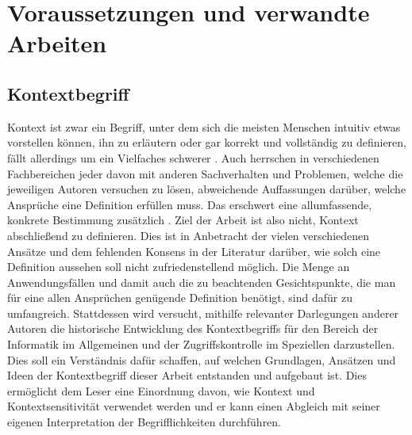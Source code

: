 \chapter{Voraussetzungen und verwandte Arbeiten}
\label{cha:requirements_and_related_work}



\section{Kontextbegriff}
Kontext ist zwar ein Begriff, unter dem sich die meisten Menschen intuitiv etwas vorstellen können, ihn zu erläutern oder gar korrekt und vollständig zu definieren, fällt allerdings um ein Vielfaches schwerer \cite{dey_understanding_2001}. Auch herrschen in verschiedenen Fachbereichen jeder davon mit anderen Sachverhalten und Problemen, welche die jeweiligen Autoren versuchen zu lösen, abweichende Auffassungen darüber, welche Ansprüche eine Definition erfüllen muss. Das erschwert eine allumfassende, konkrete Bestimmung zusätzlich \cite{hutchison_understanding_2005}. Ziel der Arbeit ist also nicht, Kontext abschließend zu definieren. Dies ist in Anbetracht der vielen verschiedenen Ansätze und dem fehlenden Konsens in der Literatur darüber, wie solch eine Definition aussehen soll \cite{alegre_engineering_2016, wei_liu_survey_2011} nicht zufriedenstellend möglich. Die Menge an Anwendungsfällen und damit auch die zu beachtenden Gesichtspunkte, die man für eine allen Ansprüchen genügende Definition benötigt, sind dafür zu umfangreich. Stattdessen wird versucht, mithilfe relevanter Darlegungen anderer Autoren die historische Entwicklung des Kontextbegriffs für den Bereich der Informatik im Allgemeinen und der Zugriffskontrolle im Speziellen darzustellen. Dies soll ein Verständnis dafür schaffen, auf welchen Grundlagen, Ansätzen und Ideen der Kontextbegriff dieser Arbeit entstanden und aufgebaut ist. Dies ermöglicht dem Leser eine Einordnung davon, wie Kontext und Kontextsensitivität verwendet werden und er kann einen Abgleich mit seiner eigenen Interpretation der Begrifflichkeiten durchführen.
